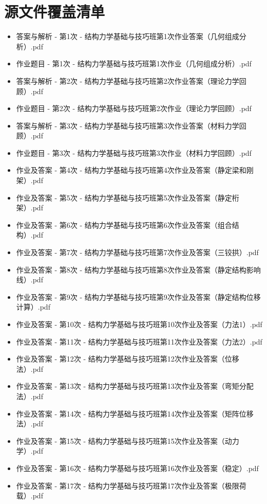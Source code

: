\documentclass[UTF8,zihao=-4,openany]{ctexbook}
\begin{document}
\chapter*{源文件覆盖清单}
\begin{itemize}
\item 答案与解析 - 第1次 - 结构力学基础与技巧班第1次作业答案（几何组成分析）.pdf
\item 作业题目 - 第1次 - 结构力学基础与技巧班第1次作业（几何组成分析）.pdf
\item 答案与解析 - 第2次 - 结构力学基础与技巧班第2次作业答案（理论力学回顾）.pdf
\item 作业题目 - 第2次 - 结构力学基础与技巧班第2次作业（理论力学回顾）.pdf
\item 答案与解析 - 第3次 - 结构力学基础与技巧班第3次作业答案（材料力学回顾）.pdf
\item 作业题目 - 第3次 - 结构力学基础与技巧班第3次作业（材料力学回顾）.pdf
\item 作业及答案 - 第4次 - 结构力学基础与技巧班第4次作业及答案（静定梁和刚架）.pdf
\item 作业及答案 - 第5次 - 结构力学基础与技巧班第5次作业及答案（静定桁架）.pdf
\item 作业及答案 - 第6次 - 结构力学基础与技巧班第6次作业及答案（组合结构）.pdf
\item 作业及答案 - 第7次 - 结构力学基础与技巧班第7次作业及答案（三铰拱）.pdf
\item 作业及答案 - 第8次 - 结构力学基础与技巧班第8次作业及答案（静定结构影响线）.pdf
\item 作业及答案 - 第9次 - 结构力学基础与技巧班第9次作业及答案（静定结构位移计算）.pdf
\item 作业及答案 - 第10次 - 结构力学基础与技巧班第10次作业及答案（力法1）.pdf
\item 作业及答案 - 第11次 - 结构力学基础与技巧班第11次作业及答案（力法2）.pdf
\item 作业及答案 - 第12次 - 结构力学基础与技巧班第12次作业及答案（位移法）.pdf
\item 作业及答案 - 第13次 - 结构力学基础与技巧班第13次作业及答案（弯矩分配法）.pdf
\item 作业及答案 - 第14次 - 结构力学基础与技巧班第14次作业及答案（矩阵位移法）.pdf
\item 作业及答案 - 第15次 - 结构力学基础与技巧班第15次作业及答案（动力学）.pdf
\item 作业及答案 - 第16次 - 结构力学基础与技巧班第16次作业及答案（稳定）.pdf
\item 作业及答案 - 第17次 - 结构力学基础与技巧班第17次作业及答案（极限荷载）.pdf

\end{itemize}
\end{document}
